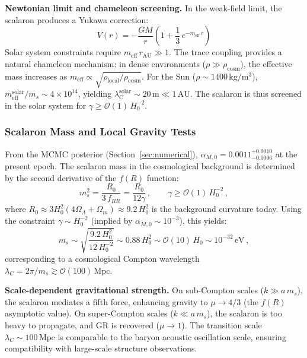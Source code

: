 \documentclass[aps,prd,twocolumn,superscriptaddress,nofootinbib]{revtex4-2}
\begin{document}
\textbf{Newtonian limit and chameleon screening.} In the weak-field limit, the scalaron produces a Yukawa correction:
\begin{equation}
V(r) = -\frac{GM}{r}\left(1 + \frac{1}{3}\,e^{-m_{\mathrm{eff}}\,r}\right)
\label{eq:yukawa}
\end{equation}
Solar system constraints require $m_{\mathrm{eff}}\,r_{\mathrm{AU}} \gg 1$. The trace coupling provides a natural chameleon mechanism: in dense environments ($\rho \gg \rho_{\mathrm{cosm}}$), the effective mass increases as $m_{\mathrm{eff}} \propto \sqrt{\rho_{\mathrm{local}}/\rho_{\mathrm{cosm}}}$. For the Sun ($\rho \sim 1400\,\mathrm{kg/m^3}$), $m_{\mathrm{eff}}^{\mathrm{solar}}/m_s \sim 4 \times 10^{14}$, yielding $\lambda_C^{\mathrm{solar}} \sim 20\,\mathrm{m} \ll 1\,\mathrm{AU}$. The scalaron is thus screened in the solar system for $\gamma \geq \mathcal{O}(1)\,H_0^{-2}$.

\subsubsection{Scalaron Mass and Local Gravity Tests}
\label{subsubsec:scalaron_mass}

From the MCMC posterior (Section~\ref{sec:numerical}), $\alpha_{M,0} = 0.0011^{+0.0010}_{-0.0006}$ at the present epoch. The scalaron mass in the cosmological background is determined by the second derivative of the $f(R)$ function:
\begin{equation}
m_s^2 = \frac{R_0}{3\,f_{RR}} = \frac{R_0}{12\gamma}\,, \qquad \gamma \geq \mathcal{O}(1)\,H_0^{-2}\,,
\label{eq:scalaron_mass}
\end{equation}
where $R_0 \approx 3H_0^2(4\Omega_\Lambda + \Omega_m) \approx 9.2\,H_0^2$ is the background curvature today. Using the constraint $\gamma \sim H_0^{-2}$ (implied by $\alpha_{M,0} \sim 10^{-3}$), this yields:
\begin{equation}
m_s \sim \sqrt{\frac{9.2\,H_0^2}{12\,H_0^{-2}}} \sim 0.88\,H_0^2 \sim \mathcal{O}(10)\,H_0 \sim 10^{-32}\,\mathrm{eV}\,,
\end{equation}
corresponding to a cosmological Compton wavelength $\lambda_C = 2\pi/m_s \gtrsim \mathcal{O}(100)\,\mathrm{Mpc}$.

\textbf{Scale-dependent gravitational strength.} On sub-Compton scales ($k \gg a\,m_s$), the scalaron mediates a fifth force, enhancing gravity to $\mu \to 4/3$ (the $f(R)$ asymptotic value). On super-Compton scales ($k \ll a\,m_s$), the scalaron is too heavy to propagate, and GR is recovered ($\mu \to 1$). The transition scale $\lambda_C \sim 100\,\mathrm{Mpc}$ is comparable to the baryon acoustic oscillation scale, ensuring compatibility with large-scale structure observations.
\end{document}

